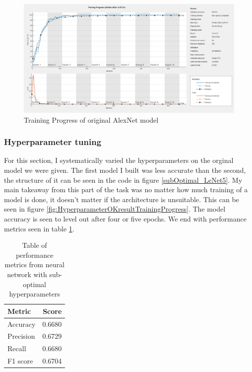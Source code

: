 \documentclass[11pt, letterpaper]{article}
\begin{document}
\begin{figure}[ht]
  \centering
  \includegraphics[width=1\linewidth]{Lab 5/OriginalAlexNetTrainingProgress.png}
  \caption{Training Progress of original AlexNet model}
  \label{fig:OriginalAlexNetTrainingProgress}
\end{figure}

\subsubsection*{Hyperparameter tuning}
For this section, I systematically varied the hyperparameters on the orginal model we were given. The first model I built was less accurate than the second, the structure of it can be seen in the code in figure \ref{subOptimal_LeNet5}. My main takeaway from this part of the task was no matter how much training of a model is done, it doesn't matter if the architecture is unsuitable. This can be seen in figure \ref{fig:HyperparameterOKresultTrainingProgress}. The model accuracy is seen to level out after four or five epochs. We end with performance metrics seen in table \ref{tab:SubOptimalHyperparametersMetrics}.

\begin{table}[ht]
  \begin{center}
    \caption{Table of performance metrics from neural network with sub-optimal hyperparameters}
    \label{tab:SubOptimalHyperparametersMetrics}
    \begin{tabular}{l|r} %
      \textbf{Metric} & \textbf{Score}\\
      \hline
      Accuracy & 0.6680\\
      Precision & 0.6729\\
      Recall & 0.6680\\
      F1 score & 0.6704\\
    \end{tabular}
  \end{center}
\end{table}
\end{document}
